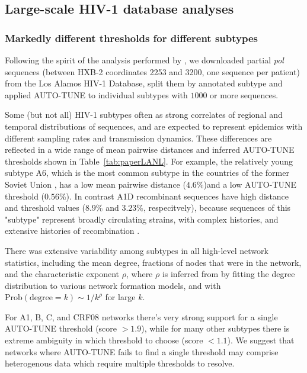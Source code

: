 \documentclass[utf8]{FrontiersinHarvard} %
\begin{document}
\subsection{Large-scale HIV-1 database analyses}

\subsubsection{Markedly different thresholds for different subtypes}
Following the spirit of the analysis performed by \citet{Wertheim:2014aa}, we downloaded partial {\it pol} sequences (between HXB-2 coordinates 2253 and 3200, one sequence per patient) from the Los Alamos HIV-1 Database, split them by annotated subtype and applied AUTO-TUNE to individual subtypes with $1000$ or more sequences.

Some (but not all) HIV-1 subtypes often as strong correlates of regional and temporal distributions of sequences, and are expected to represent epidemics with different sampling rates and transmission dynamics. These differences are reflected in a wide range of mean pairwise distances and inferred AUTO-TUNE thresholds shown in Table~\ref{tab:paperLANL}. For example, the relatively young subtype A6, which is the most common subtype in the countries of the former Soviet Union \cite{Abidi:2021aa}, has a low mean pairwise distance ($4.6\%$)and a low AUTO-TUNE threshold ($0.56\%$). In contrast A1D recombinant sequences have high distance and threshold values ($8.9\%$ and $3.23\%$, respecitvely), because sequences of this "subtype" represent broadly circulating strains, with complex histories, and extensive histories of recombination \cite{Foster:2014aa,Yebra:2015aa}. 

There was extensive variability among subtypes in all high-level network statistics, including the mean degree, fractions of nodes that were in the network, and the characteristic exponent $\rho$, where $\rho$ is inferred from by fitting the degree distribution to various network formation models, and with $\text{Prob}(\text{degree} = k) \sim 1/k^\rho$ for large $k$. 

For A1, B, C, and CRF08 networks there's very strong support for a single AUTO-TUNE threshold (score $>1.9$), while for many other subtypes there is extreme ambiguity in which threshold to choose (score $<1.1$). We suggest that networks where AUTO-TUNE fails to find a single threshold may comprise heterogenous data which require multiple thresholds to resolve. 
\end{document}
